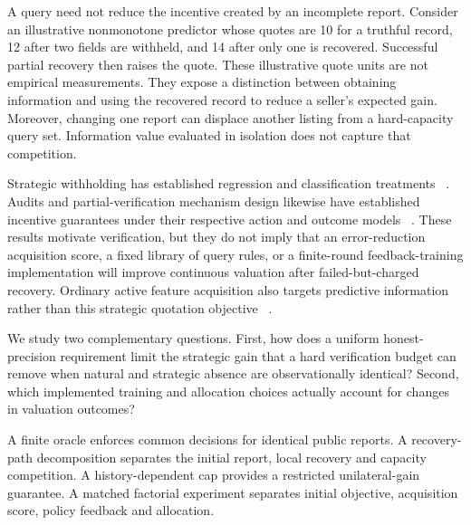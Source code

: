 \documentclass[11pt]{article}
\begin{document}
A query need not reduce the incentive created by an incomplete report. Consider
an illustrative nonmonotone predictor whose quotes are 10 for a truthful record,
12 after two fields are withheld, and 14 after only one is recovered. Successful
partial recovery then raises the quote. These illustrative quote units are not
empirical measurements. They expose a distinction between obtaining information
and using the recovered record to reduce a seller's expected gain. Moreover,
changing one report can displace another listing from a hard-capacity query set.
Information value evaluated in isolation does not capture that competition.

Strategic withholding has established regression and classification treatments
~\cite{smi,withheld}. Audits and partial-verification mechanism design likewise
have established incentive guarantees under their respective action and outcome
models ~\cite{audits,partial}. These results motivate verification, but they do
not imply that an error-reduction acquisition score, a fixed library of query
rules, or a finite-round feedback-training implementation will improve
continuous valuation after failed-but-charged recovery. Ordinary active feature
acquisition also targets predictive information rather than this strategic
quotation objective ~\cite{activeoracle}.

We study two complementary questions. First, how does a uniform honest-precision
requirement limit the strategic gain that a hard verification budget can remove
when natural and strategic absence are observationally identical? Second, which
implemented training and allocation choices actually account for changes in
valuation outcomes?

A finite oracle enforces common decisions for identical
public reports. A recovery-path decomposition separates the initial report,
local recovery and capacity competition. A history-dependent cap provides a
restricted unilateral-gain guarantee. A matched factorial experiment separates
initial objective, acquisition score, policy feedback and allocation.
\end{document}
